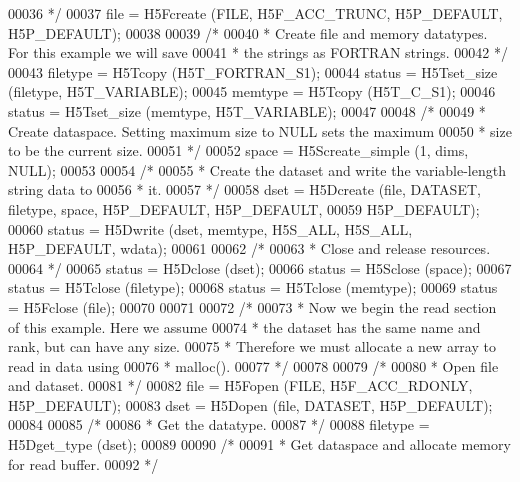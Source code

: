 \begin{DoxyCode}
00036 \textcolor{comment}{     */}
00037     file = H5Fcreate (FILE, H5F\_ACC\_TRUNC, H5P\_DEFAULT, H5P\_DEFAULT);
00038 
00039     \textcolor{comment}{/*}
00040 \textcolor{comment}{     * Create file and memory datatypes.  For this example we will save}
00041 \textcolor{comment}{     * the strings as FORTRAN strings.}
00042 \textcolor{comment}{     */}
00043     filetype = H5Tcopy (H5T\_FORTRAN\_S1);
00044     status = H5Tset\_size (filetype, H5T\_VARIABLE);
00045     memtype = H5Tcopy (H5T\_C\_S1);
00046     status = H5Tset\_size (memtype, H5T\_VARIABLE);
00047 
00048     \textcolor{comment}{/*}
00049 \textcolor{comment}{     * Create dataspace.  Setting maximum size to NULL sets the maximum}
00050 \textcolor{comment}{     * size to be the current size.}
00051 \textcolor{comment}{     */}
00052     space = H5Screate\_simple (1, dims, NULL);
00053 
00054     \textcolor{comment}{/*}
00055 \textcolor{comment}{     * Create the dataset and write the variable-length string data to}
00056 \textcolor{comment}{     * it.}
00057 \textcolor{comment}{     */}
00058     dset = H5Dcreate (file, DATASET, filetype, space, H5P\_DEFAULT, H5P\_DEFAULT,
00059                 H5P\_DEFAULT);
00060     status = H5Dwrite (dset, memtype, H5S\_ALL, H5S\_ALL, H5P\_DEFAULT, wdata);
00061 
00062     \textcolor{comment}{/*}
00063 \textcolor{comment}{     * Close and release resources.}
00064 \textcolor{comment}{     */}
00065     status = H5Dclose (dset);
00066     status = H5Sclose (space);
00067     status = H5Tclose (filetype);
00068     status = H5Tclose (memtype);
00069     status = H5Fclose (file);
00070 
00071 
00072     \textcolor{comment}{/*}
00073 \textcolor{comment}{     * Now we begin the read section of this example.  Here we assume}
00074 \textcolor{comment}{     * the dataset has the same name and rank, but can have any size.}
00075 \textcolor{comment}{     * Therefore we must allocate a new array to read in data using}
00076 \textcolor{comment}{     * malloc().}
00077 \textcolor{comment}{     */}
00078 
00079     \textcolor{comment}{/*}
00080 \textcolor{comment}{     * Open file and dataset.}
00081 \textcolor{comment}{     */}
00082     file = H5Fopen (FILE, H5F\_ACC\_RDONLY, H5P\_DEFAULT);
00083     dset = H5Dopen (file, DATASET, H5P\_DEFAULT);
00084 
00085     \textcolor{comment}{/*}
00086 \textcolor{comment}{     * Get the datatype.}
00087 \textcolor{comment}{     */}
00088     filetype = H5Dget\_type (dset);
00089 
00090     \textcolor{comment}{/*}
00091 \textcolor{comment}{     * Get dataspace and allocate memory for read buffer.}
00092 \textcolor{comment}{     */}

\end{DoxyCode}
